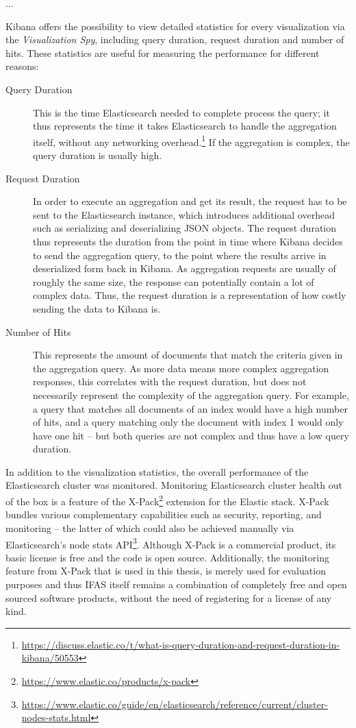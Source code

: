 ...

Kibana offers the possibility to view detailed statistics for every visualization via the \emph{Visualization Spy}, including query duration, request duration and number of hits.
These statistics are useful for measuring the performance for different reasons:

\begin{description}
\item[Query Duration] This is the time Elasticsearch needed to complete process the query; it thus represents the time it takes Elasticsearch to handle the aggregation itself, without any networking overhead.\footnote{\url{https://discuss.elastic.co/t/what-is-query-duration-and-request-duration-in-kibana/50553}}
If the aggregation is complex, the query duration is usually high.
\item[Request Duration] In order to execute an aggregation and get its result, the request has to be sent to the Elasticsearch instance, which introduces additional overhead such as serializing and deserializing \ac{JSON} objects.
The request duration thus represents the duration from the point in time where Kibana decides to send the aggregation query, to the point where the results arrive in deserialized form back in Kibana.
As aggregation requests are usually of roughly the same size, the response can potentially contain a lot of complex data.
Thus, the request duration is a representation of how costly sending the data to Kibana is.
\item[Number of Hits] This represents the amount of documents that match the criteria given in the aggregation query.
As more data means more complex aggregation responses, this correlates with the request duration, but does not necessarily represent the complexity of the aggregation query.
For example, a query that matches all documents of an index would have a high number of hits, and a query matching only the document with index 1 would only have one hit -- but both queries are not complex and thus have a low query duration.
\end{description}

In addition to the visualization statistics, the overall performance of the Elasticsearch cluster was monitored.
Monitoring Elasticsearch cluster health out of the box is a feature of the X-Pack\footnote{\url{https://www.elastic.co/products/x-pack}} extension for the Elastic stack.
X-Pack bundles various complementary capabilities such as security, reporting, and monitoring -- the latter of which could also be achieved manually via Elasticsearch's node stats API\footnote{\url{https://www.elastic.co/guide/en/elasticsearch/reference/current/cluster-nodes-stats.html}}.
Although X-Pack is a commercial product, its basic license is free and the code is open source.
Additionally, the monitoring feature from X-Pack that is used in this thesis, is merely used for evaluation purposes and thus \ac{IFAS} itself remains a combination of completely free and open sourced software products, without the need of registering for a license of any kind.

